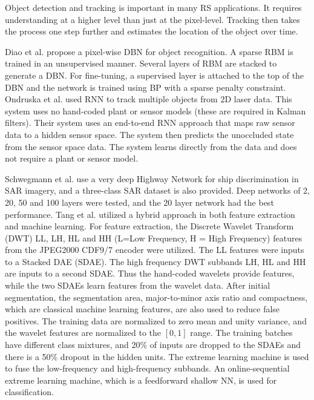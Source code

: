 \documentclass[12pt]{spieman}
\begin{document}
\begin{spacing}{1}
Object detection and tracking is important in many RS applications. It requires understanding at a higher level than just at the pixel-level. Tracking then takes the process one step further and estimates the location of the object over time.

Diao et al. \cite{diao2015object} propose a pixel-wise DBN for object recognition. A sparse RBM is trained in an unsupervised manner. Several layers of RBM are stacked to generate a DBN. For fine-tuning, a supervised layer is attached to the top of the DBN and the network is trained using BP with a sparse penalty constraint. Ondruska et al. \cite{Ondruska2016Deep} used RNN to track multiple objects from 2D laser data. This system uses no hand-coded plant or sensor models (these are required in Kalman filters). Their system uses an end-to-end RNN approach that maps raw sensor data to a hidden sensor space. The system then predicts the unoccluded state from the sensor space data. The system learns directly from the data and does not require a plant or sensor model.

Schwegmann et al. \cite{schwegmann2016very} use a very deep Highway Network for ship discrimination in SAR imagery, and a three-class SAR dataset is also provided. Deep networks of 2, 20, 50 and 100 layers were tested, and the 20 layer network had the best performance. Tang et al. \cite{Tang2015Compressed} utilized a hybrid approach in both feature extraction and machine learning. For feature extraction, the Discrete Wavelet Transform (DWT) LL, LH, HL and HH (L=Low Frequency, H = High Frequency) features from the JPEG2000 CDF9/7 encoder were utilized. The LL features were inputs to a Stacked DAE (SDAE). The high frequency DWT subbands LH, HL and HH are inputs to a second SDAE. Thus the hand-coded wavelets provide features, while the two SDAEs learn features from the wavelet data. After initial segmentation, the segmentation area, major-to-minor axis ratio and compactness, which are classical machine learning features, are also used to reduce false positives. The training data are normalized to zero mean and unity variance, and the wavelet features are normalized to the $[0,1]$ range. The training batches have different class mixtures, and 20\% of inputs are dropped to the SDAEs and there is a 50\% dropout in the hidden units. The extreme learning machine is used to fuse the low-frequency and high-frequency subbands. An online-sequential extreme learning machine, which is a feedforward shallow NN, is used for classification. 


\end{spacing}
\end{document}
